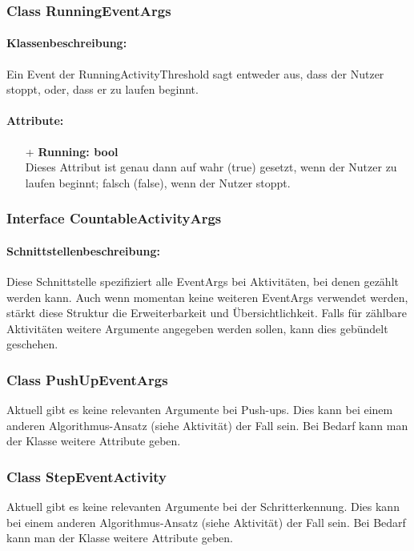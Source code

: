 \documentclass[a4paper,12pt]{article}
\begin{document}
	\subsubsection{Class RunningEventArgs}
	\paragraph{Klassenbeschreibung:}
	Ein Event der RunningActivityThreshold sagt entweder aus, dass der Nutzer stoppt, oder, dass er zu laufen beginnt.
	\paragraph{Attribute:}
	\begin{itemize}
		\item[+] \textbf{Running: bool}\\ Dieses Attribut ist genau dann auf wahr (true) gesetzt, wenn der Nutzer zu laufen beginnt; falsch (false), wenn der Nutzer stoppt.
	\end{itemize} 

	\subsubsection{Interface CountableActivityArgs}
	\paragraph{Schnittstellenbeschreibung:}
	Diese Schnittstelle spezifiziert alle EventArgs bei Aktivitäten, bei denen gezählt werden kann. Auch wenn momentan keine weiteren EventArgs verwendet werden, stärkt diese Struktur die Erweiterbarkeit und Übersichtlichkeit. Falls für zählbare Aktivitäten weitere Argumente angegeben werden sollen, kann dies gebündelt geschehen.
	
	\subsubsection{Class PushUpEventArgs}
	Aktuell gibt es keine relevanten Argumente bei Push-ups. Dies kann bei einem anderen Algorithmus-Ansatz (siehe Aktivität) der Fall sein. Bei Bedarf kann man der Klasse weitere Attribute geben.
	\subsubsection{Class StepEventActivity}
	Aktuell gibt es keine relevanten Argumente bei der Schritterkennung. Dies kann bei einem anderen Algorithmus-Ansatz (siehe Aktivität) der Fall sein. Bei Bedarf kann man der Klasse weitere Attribute geben.
\end{document}
